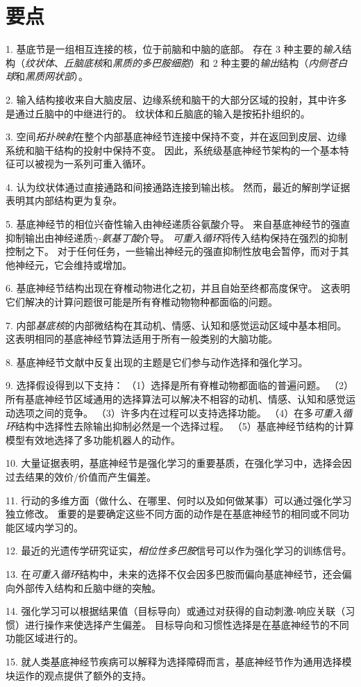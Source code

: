 \section{要点}

1. 基底节是一组相互连接的核，位于前脑和中脑的底部。
存在 3 种主要的\textit{输入}结构（\textit{纹状体}、\textit{丘脑底核}和\textit{黑质的多巴胺细胞}）和 2 种主要的\textit{输出}结构（\textit{内侧苍白球}和\textit{黑质网状部}）。


2. 输入结构接收来自大脑皮层、边缘系统和脑干的大部分区域的投射，其中许多是通过丘脑中的中继进行的。
纹状体和丘脑底的输入是按拓扑组织的。


3. 空间\textit{拓扑映射}在整个内部基底神经节连接中保持不变，并在返回到皮层、边缘系统和脑干结构的投射中保持不变。
因此，系统级基底神经节架构的一个基本特征可以被视为一系列可重入循环。


4. 认为纹状体通过直接通路和间接通路连接到输出核。
然而，最近的解剖学证据表明其内部结构更为复杂。


5. 基底神经节的相位兴奋性输入由神经递质谷氨酸介导。
来自基底神经节的强直抑制输出由神经递质\textit{$\gamma$-氨基丁酸}介导。
\textit{可重入循环}将传入结构保持在强烈的抑制控制之下。
对于任何任务，一些输出神经元的强直抑制性放电会暂停，而对于其他神经元，它会维持或增加。


6. 基底神经节结构出现在脊椎动物进化之初，并且自始至终都高度保守。
这表明它们解决的计算问题很可能是所有脊椎动物物种都面临的问题。


7. 内部\textit{基底核}的内部微结构在其动机、情感、认知和感觉运动区域中基本相同。
这表明相同的基底神经节算法适用于所有一般类别的大脑功能。


8. 基底神经节文献中反复出现的主题是它们参与动作选择和强化学习。


9. 选择假设得到以下支持：
（1）选择是所有脊椎动物都面临的普遍问题。
（2）所有基底神经节区域通用的选择算法可以解决不相容的动机、情感、认知和感觉运动选项之间的竞争。
（3）许多内在过程可以支持选择功能。
（4）在多\textit{可重入循环}结构中选择性去除输出抑制必然是一个选择过程。
（5）基底神经节结构的计算模型有效地选择了多功能机器人的动作。 


10. 大量证据表明，基底神经节是强化学习的重要基质，在强化学习中，选择会因过去结果的效价/价值而产生偏差。


11. 行动的多维方面（做什么、在哪里、何时以及如何做某事）可以通过强化学习独立修改。
重要的是要确定这些不同方面的动作是在基底神经节的相同或不同功能区域内学习的。


12. 最近的光遗传学研究证实，\textit{相位性多巴胺}信号可以作为强化学习的训练信号。


13. 在\textit{可重入循环}结构中，未来的选择不仅会因多巴胺而偏向基底神经节，还会偏向外部传入结构和丘脑中继的突触。


14. 强化学习可以根据结果值（目标导向）或通过对获得的自动刺激-响应关联（习惯）进行操作来使选择产生偏差。
目标导向和习惯性选择是在基底神经节的不同功能区域进行的。


15. 就人类基底神经节疾病可以解释为选择障碍而言，基底神经节作为通用选择模块运作的观点提供了额外的支持。

